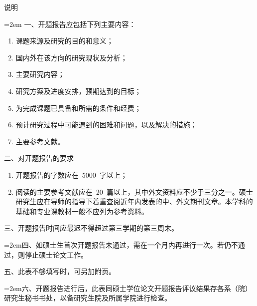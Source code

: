 {%
\newpage
\thispagestyle{empty}
\vspace*{2em}
\begin{center}
  \heiti{}说\hspace{3em}明
\end{center}
\vspace*{40pt}
	\renewcommand{\arraystretch}{1.25}
    {\songti{}
    \hangindent=2em
	\noindent 一、开题报告应包括下列主要内容：
    \begin{enumerate}[leftmargin=36pt]
	\item 课题来源及研究的目的和意义；
	\item 国内外在该方向的研究现状及分析；
	\item 主要研究内容；
	\item 研究方案及进度安排，预期达到的目标；
	\item 为完成课题已具备和所需的条件和经费；
	\item 预计研究过程中可能遇到的困难和问题，以及解决的措施；
	\item 主要参考文献。
    \end{enumerate}
    \noindent 二、对开题报告的要求
	\begin{enumerate}[leftmargin=36pt]
	\item 开题报告的字数应在~5000~字以上；
	\item 阅读的主要参考文献应在~20~篇以上，其中外文资料应不少于三分之一。硕士研究生应在导师的指导下着重查阅近年内发表的中、\hspace{-1pt}外文期刊文章。\hspace{-1pt}本学科的基础和专业课教材一般不应列为参考资料。
    \end{enumerate}
    \noindent 三、开题报告时间应最迟不得超过第三学期的第三周末。

    \hangindent=2em\noindent 四、如硕士生首次开题报告未通过，\hspace{-2pt}需在一个月内再进行一次。\hspace{-3pt}若仍不通过，\hspace{-2pt}则停止硕士论文工作。

    \noindent 五、此表不够填写时，可另加附页。

\hangindent=2em\noindent 六、开题报告进行后，此表同硕士学位论文开题报告评议结果存各系（院）研究生秘书书处，以备研究生院及所属学院进行检查。

    }
	\renewcommand{\arraystretch}{1}
    \clearpage
}
\fi
\makeatother